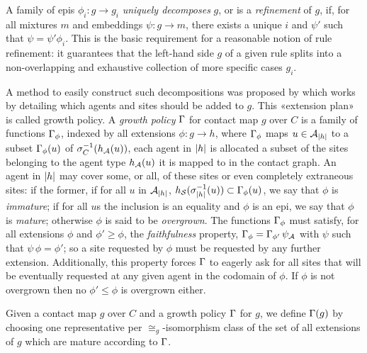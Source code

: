 A family of epis $\phi_i: g \to g_i$ \emph{uniquely decomposes} $g$,
or is a \emph{refinement} of $g$, if,
for all mixtures $m$ and embeddings $\psi: g \to m$,
there exists a unique $i$ and $\psi'$ such that $\psi = \psi' \phi_i$.
This is the basic requirement
for a reasonable notion of rule refinement:
it guarantees that the left-hand side $g$ of a given rule
splits into a non-overlapping and exhaustive collection
of more specific cases $g_i$.


A method to easily construct such decompositions
was proposed by \citet{refinement}
which works by detailing
which agents and sites should be added to $g$.
This «extension plan» is called growth policy.
A \emph{growth policy} $\Gamma$ for contact map $g$ over $C$
is a family of functions $\Gamma_\phi$,
indexed by all extensions $\phi: g \to h$,
where $\Gamma_\phi$ maps $u \in \mathcal{A}_{\left|h\right|}$ to
a subset $\Gamma_\phi(u)$ of $\sigma_C^{-1}(h_{\mathcal{A}}(u))$,
\ie each agent in $\left|h\right|$ is allocated
a subset of the sites belonging to the agent type $h_{\mathcal{A}}(u)$
it is mapped to in the contact graph.
%
An agent in $\left|h\right|$ may cover some, or all,
of these sites or even completely extraneous sites:
if the former, \ie if for all $u$ in $\mathcal{A}_{\left|h\right|}$,
$h_{\mathcal{S}}(\sigma_{\left|h\right|}^{-1}(u)) \subset \Gamma_\phi(u)$,
we say that $\phi$ is \emph{immature};
if for all $u$s the inclusion is an equality
and $\phi$ is an epi,
we say that $\phi$ is \emph{mature};
otherwise $\phi$ is said to be \emph{overgrown}.
The functions $\Gamma_\phi$ must satisfy,
for all extensions $\phi$ and $\phi' \geq \phi$,
the \emph{faithfulness} property,
$\Gamma_\phi = \Gamma_{\phi'} \, \psi_{\mathcal{A}}$
with $\psi$ such that $\psi \, \phi = \phi'$;
so a site requested by $\phi$
must be requested by any further extension.
Additionally, this property forces $\Gamma$ to eagerly ask
for all sites that will be eventually requested
at any given agent in the codomain of $\phi$.
If $\phi$ is not overgrown
then no $\phi' \leq \phi$ is overgrown either.

Given a contact map $g$ over $C$ and a growth policy $\Gamma$ for $g$,
we define $\Gamma(g)$ by choosing one representative
per $\cong_g$-isomorphism class of the set of all extensions of $g$
which are mature according to $\Gamma$.

